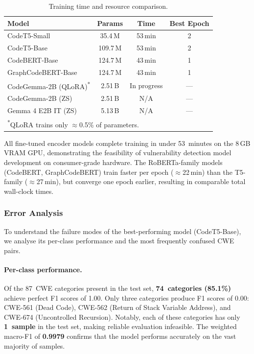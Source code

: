 \begin{table}[t]
\centering
\caption{Training time and resource comparison.}
\label{tab:training_time}
\begin{tabular}{lccc}
\hline
\textbf{Model} & \textbf{Params} & \textbf{Time} & \textbf{Best Epoch} \\
\hline
CodeT5-Small       & 35.4\,M  & 53\,min & 2 \\
CodeT5-Base        & 109.7\,M & 53\,min & 2 \\
CodeBERT-Base      & 124.7\,M & 43\,min & 1 \\
GraphCodeBERT-Base & 124.7\,M & 43\,min & 1 \\
\hline
CodeGemma-2B (QLoRA)\textsuperscript{*} & 2.51\,B & In progress & --- \\
CodeGemma-2B (ZS)  & 2.51\,B  & N/A   & --- \\
Gemma 4 E2B IT (ZS)& 5.13\,B  & N/A   & --- \\
\hline
\multicolumn{4}{l}{\footnotesize\textsuperscript{*}QLoRA trains only $\approx$0.5\% of parameters.} \\
\end{tabular}
\end{table}

All fine-tuned encoder models complete training in under 53~minutes on the
8\,GB VRAM GPU, demonstrating the feasibility of vulnerability detection
model development on consumer-grade hardware.  The RoBERTa-family models
(CodeBERT, GraphCodeBERT) train faster per epoch ($\approx$22\,min) than the
T5-family ($\approx$27\,min), but converge one epoch earlier, resulting in
comparable total wall-clock times.

\subsubsection{Error Analysis}
To understand the failure modes of the best-performing model (CodeT5-Base),
we analyse its per-class performance and the most frequently confused CWE
pairs.

\paragraph{Per-class performance.}
Of the 87~CWE categories present in the test set, \textbf{74~categories
(85.1\%)} achieve perfect F1 scores of 1.00.  Only three categories produce
F1 scores of 0.00: CWE-561 (Dead Code), CWE-562 (Return of Stack Variable
Address), and CWE-674 (Uncontrolled Recursion).  Notably, each of these
categories has only \textbf{1~sample} in the test set, making reliable
evaluation infeasible.  The weighted macro-F1 of \textbf{0.9979} confirms
that the model performs accurately on the vast majority of samples.

